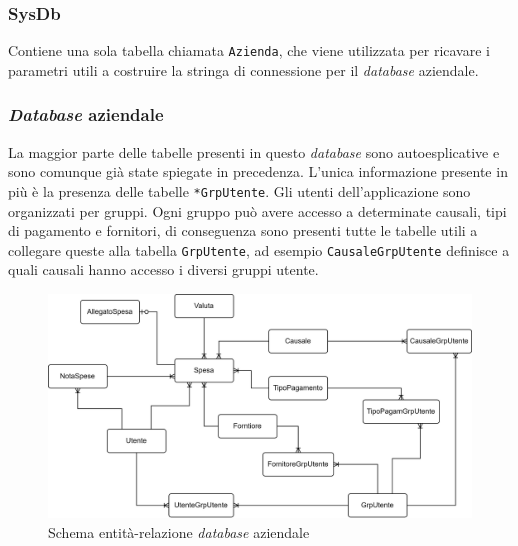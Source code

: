 \subsubsection{SysDb}

Contiene una sola tabella chiamata \texttt{Azienda}, che viene utilizzata per ricavare i parametri utili a costruire la stringa di connessione per il \textit{database} aziendale.

\subsubsection{\textit{Database} aziendale}

La maggior parte delle tabelle presenti in questo \textit{database} sono autoesplicative e sono comunque già state spiegate in precedenza. L'unica informazione presente in più è la presenza delle tabelle \texttt{*GrpUtente}. Gli utenti dell'applicazione sono organizzati per gruppi. Ogni gruppo può avere accesso a determinate causali, tipi di pagamento e fornitori, di conseguenza sono presenti tutte le tabelle utili a collegare queste alla tabella \texttt{GrpUtente}, ad esempio \texttt{CausaleGrpUtente} definisce a quali causali hanno accesso i diversi gruppi utente.

\begin{figure}[H]
    \centering
    \includegraphics[width=\columnwidth]{images/ER moviEXPENSE.png}
    \caption{Schema entità-relazione \textit{database} aziendale}
\end{figure}
